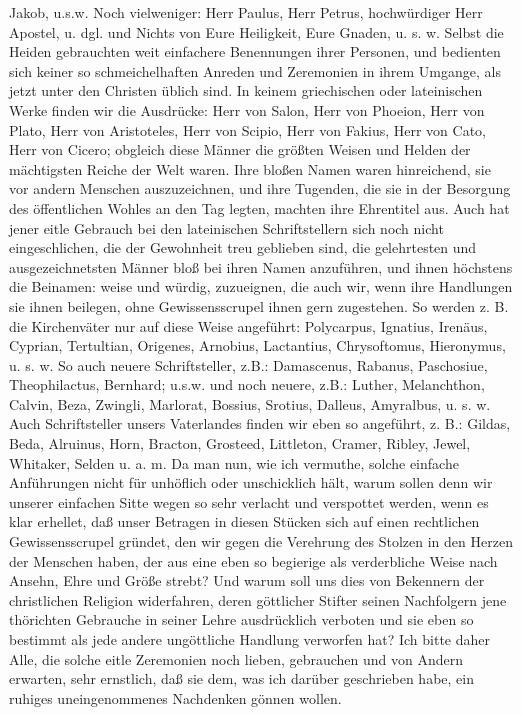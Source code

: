 Jakob, u.s.w. Noch vielweniger: Herr Paulus, Herr Petrus, hochwürdiger Herr Apostel, u. dgl. und Nichts von Eure Heiligkeit, Eure Gnaden, u. s. w. Selbst die Heiden gebrauchten weit einfachere Benennungen ihrer Personen, und bedienten sich keiner so schmeichelhaften Anreden und Zeremonien in ihrem Umgange, als jetzt unter den Christen üblich sind. In keinem griechischen oder lateinischen Werke finden wir die Ausdrücke: Herr von Salon, Herr von Phoeion, Herr von Plato, Herr von Aristoteles, Herr von Scipio, Herr von Fakius, Herr von Cato, Herr von Cicero; obgleich diese Männer die größten Weisen und Helden der mächtigsten Reiche der Welt waren. Ihre bloßen Namen waren hinreichend, sie vor andern Menschen auszuzeichnen, und ihre Tugenden, die sie in der Besorgung des öffentlichen Wohles an den Tag legten, machten ihre Ehrentitel aus. Auch hat jener eitle Gebrauch bei den lateinischen Schriftstellern sich noch nicht eingeschlichen, die der Gewohnheit treu geblieben sind, die gelehrtesten und ausgezeichnetsten Männer bloß bei ihren Namen anzuführen, und ihnen höchstens die Beinamen: weise und würdig, zuzueignen, die auch wir, wenn ihre Handlungen sie ihnen beilegen, ohne Gewissensscrupel ihnen gern zugestehen. So werden z. B. die Kirchenväter nur auf diese Weise angeführt: Polycarpus, Ignatius, Irenäus, Cyprian, Tertultian, Origenes, Arnobius, Lactantius, Chrysoftomus, Hieronymus, u. s. w. So auch neuere Schriftsteller, z.B.: Damascenus, Rabanus, Paschosiue, Theophilactus, Bernhard; u.s.w. und noch neuere, z.B.: Luther, Melanchthon, Calvin, Beza, Zwingli, Marlorat, Bossius, Srotius, Dalleus, Amyralbus, u. s. w. Auch Schriftsteller unsers Vaterlandes finden wir eben so angeführt, z. B.: Gildas, Beda, Alruinus, Horn, Bracton, Grosteed, Littleton, Cramer, Ribley, Jewel, Whitaker, Selden u. a. m. Da man nun, wie ich vermuthe, solche einfache Anführungen nicht für unhöflich oder unschicklich hält, warum sollen denn wir unserer einfachen Sitte wegen so sehr verlacht und verspottet werden, wenn es klar erhellet, daß unser Betragen in diesen Stücken sich auf einen rechtlichen Gewissensscrupel gründet, den wir gegen die Verehrung des Stolzen in den Herzen der Menschen haben, der aus eine eben so begierige als verderbliche Weise nach Ansehn, Ehre und Größe strebt? Und warum soll uns dies von Bekennern der christlichen Religion widerfahren, deren göttlicher Stifter seinen Nachfolgern jene thörichten Gebrauche in seiner Lehre ausdrücklich verboten und sie eben so bestimmt als jede andere ungöttliche Handlung verworfen hat? Ich bitte daher Alle, die solche eitle Zeremonien noch lieben, gebrauchen und von Andern erwarten, sehr ernstlich, daß sie dem, was ich darüber geschrieben habe, ein ruhiges uneingenommenes  Nachdenken gönnen wollen.


